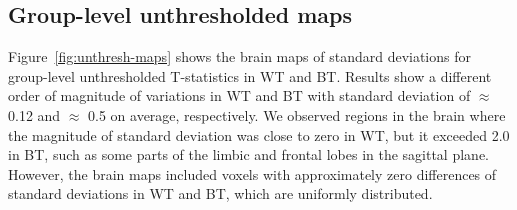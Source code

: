 \documentclass[conference]{IEEEtran}
\begin{document}
  \begin{figure}[ht]
  \end{figure}



\subsection{Group-level unthresholded maps}

Figure~\ref{fig:unthresh-maps} shows the brain maps of standard deviations for group-level unthresholded T-statistics in WT and BT.
Results show a different order of magnitude of variations in WT and BT with standard deviation
of $\approx$ 0.12 and $\approx$ 0.5 on average, respectively.
We observed regions in the brain where the magnitude of standard deviation was close to zero in WT, but it exceeded 2.0 in BT,
such as some parts of the limbic and frontal lobes in the sagittal plane.
However, the brain maps included voxels with approximately zero differences of standard deviations in WT and BT, which are uniformly distributed.
\end{document}
